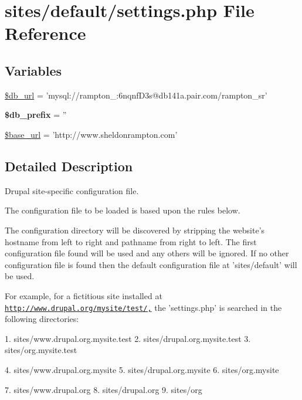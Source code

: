 \hypertarget{default_2settings_8php}{
\section{sites/default/settings.php File Reference}
\label{default_2settings_8php}
}
\subsection*{Variables}
\begin{CompactItemize}
\item 
\hyperlink{default_2settings_8php_01f60cfc6d59f1f30585ac6b516d739b}{\$db\_\-url} = 'mysql://rampton\_:6nqnfD3s@db141a.pair.com/rampton\_\-sr'
\item 
\hypertarget{default_2settings_8php_f2a4215b966f1c790a75937650bde991}{
\textbf{\$db\_\-prefix} = ''}
\label{default_2settings_8php_f2a4215b966f1c790a75937650bde991}

\item 
\hyperlink{default_2settings_8php_6886427c9c643f707fcb35c018049bc7}{\$base\_\-url} = 'http://www.sheldonrampton.com'
\end{CompactItemize}


\subsection{Detailed Description}
Drupal site-specific configuration file.

The configuration file to be loaded is based upon the rules below.

The configuration directory will be discovered by stripping the website's hostname from left to right and pathname from right to left. The first configuration file found will be used and any others will be ignored. If no other configuration file is found then the default configuration file at 'sites/default' will be used.

For example, for a fictitious site installed at \href{http://www.drupal.org/mysite/test/,}{\tt http://www.drupal.org/mysite/test/,} the 'settings.php' is searched in the following directories:

1. sites/www.drupal.org.mysite.test 2. sites/drupal.org.mysite.test 3. sites/org.mysite.test

4. sites/www.drupal.org.mysite 5. sites/drupal.org.mysite 6. sites/org.mysite

7. sites/www.drupal.org 8. sites/drupal.org 9. sites/org

